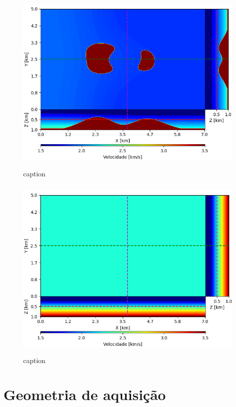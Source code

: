 \begin{figure}[H]
	\centering
	\includegraphics[width=12cm,height=9cm]{Imgs/Metodologia/true_model.png}
	\caption{caption}
	\label{fig:}	
\end{figure}


\begin{figure}[H]
	\centering
	\includegraphics[width=12cm,height=9cm]{Imgs/Metodologia/init_model.png}
	\caption{caption}
	\label{fig:}	
\end{figure}




\section{Geometria de aquisição}

